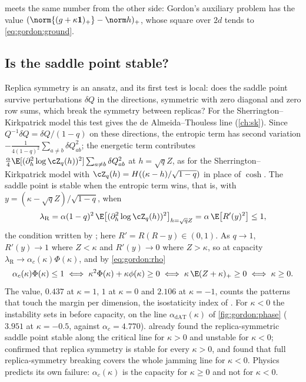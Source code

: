 \begin{refsection}
 meets the same number from the other side: Gordon's auxiliary problem has the value $(\norm{(g+\kappa\mathbf 1)_+}-\norm h)_+$, whose square over $2d$ tends to \eqref{eq:gordon:ground}.

\subsection{Is the saddle point stable?}\label{sec:gordon:at}

Replica symmetry is an ansatz, and its first test is local: does the saddle point survive perturbations $\delta Q$ in the  directions, symmetric with zero diagonal and zero row sums, which break the symmetry between replicas? For the Sherrington--Kirkpatrick model this test gives the de Almeida--Thouless line (\cref{ch:sk}). Since $Q^{-1}\delta Q=\delta Q/(1-q)$ on these directions, the entropic term has second variation $-\frac1{4(1-q)^2}\sum_{a\ne b}\delta Q_{ab}^2$; the energetic term contributes $\frac\alpha4\E[(\partial_h^2\log\cZ_q(h))^2]\sum_{a\ne b}\delta Q_{ab}^2$ at $h=\sqrt qZ$, as for the Sherrington--Kirkpatrick model with $\cZ_q(h)=H((\kappa-h)/\sqrt{1-q})$ in place of $\cosh$. The saddle point is stable when the entropic term wins, that is, with $y=(\kappa-\sqrt qZ)/\sqrt{1-q}$, when
\begin{equation}\label{eq:gordon:replicon}
\lambda_{\mathrm R}=\alpha(1-q)^2\,\E\bigl[(\partial_h^2\log\cZ_q(h))^2\bigr]_{h=\sqrt qZ}=\alpha\,\E\bigl[R'(y)^2\bigr]\le1,
\end{equation}
the condition written by \textcite[eq.~(52)]{FranzEtAl2017}; here $R'=R(R-y)\in(0,1)$. As $q\to1$, $R'(y)\to1$ where $Z<\kappa$ and $R'(y)\to0$ where $Z>\kappa$, so at capacity $\lambda_{\mathrm R}\to\alpha_c(\kappa)\Phi(\kappa)$, and by \eqref{eq:gordon:rho}
\[
\alpha_c(\kappa)\Phi(\kappa)\le1\iff\kappa^2\Phi(\kappa)+\kappa\phi(\kappa)\ge0\iff\kappa\,\E(Z+\kappa)_+\ge0\iff\kappa\ge0.
\]
The value, $0.437$ at $\kappa=1$, $1$ at $\kappa=0$ and $2.106$ at $\kappa=-1$, counts the patterns that touch the margin per dimension, the isostaticity index of \textcite{FranzEtAl2017}. For $\kappa<0$ the instability sets in before capacity, on the line $\alpha_{\mathrm{dAT}}(\kappa)$ of \cref{fig:gordon:phase} ($3.951$ at $\kappa=-0.5$, against $\alpha_c=4.770$). \Textcite[Figure~1]{GardnerDerrida1988} already found the replica-symmetric saddle point stable along the critical line for $\kappa>0$ and unstable for $\kappa<0$; \textcite{FranzEtAl2017} confirmed that replica symmetry is stable for every $\kappa>0$, and found that full replica-symmetry breaking covers the whole jamming line for $\kappa<0$. Physics predicts its own failure: $\alpha_c(\kappa)$ is the capacity for $\kappa\ge0$ and not for $\kappa<0$.


\end{refsection}
